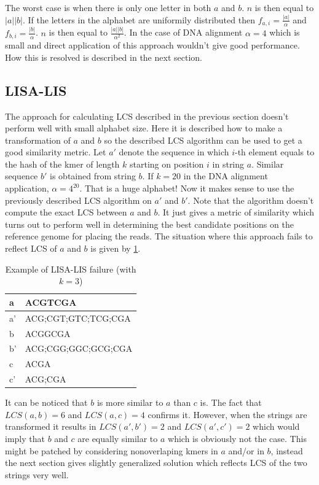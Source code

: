\documentclass[times, utf8, diplomski]{fer}
\begin{document}
The worst case is when there is only one letter in both $a$ and $b$. $n$ is then equal to $|a||b|$.
If the letters in the alphabet are uniformily distributed then $f_{a,i}=\frac{|a|}{\alpha}$ and $f_{b,i}=\frac{|b|}{\alpha}$. $n$ is then equal to $\frac{|a||b|}{\alpha^2}$.
In the case of DNA alignment $\alpha=4$ which is small and direct application of this approach wouldn't give good performance. How this is resolved is described in the next section.

\subsection{LISA-LIS}

The approach for calculating LCS described in the previous section doesn't perform well with small alphabet size. Here it is described how to make a transformation of $a$ and $b$ so the described LCS algorithm can be used to get a good similarity metric. Let $a'$ denote the sequence in which $i$-th element equals to the hash of the kmer of length $k$ starting on position $i$ in string $a$. Similar sequence $b'$ is obtained from string $b$. If $k=20$ in the DNA alignment application, $\alpha=4^{20}$. That is a huge alphabet! Now it makes sense to use the previously described LCS algorithm on $a'$ and $b'$. Note that the algorithm doesn't compute the exact LCS between $a$ and $b$. It just gives a metric of similarity which turns out to perform well in determining the best candidate positions on the reference genome for placing the reads. The situation where this approach fails to reflect LCS of $a$ and $b$ is given by \ref{lisalis.fail}.

\begin{table}[H]
\centering
\begin{tabular}{|l|l|}
\hline
	a & ACGTCGA\\
\hline
	a' & ACG;CGT;GTC;TCG;CGA\\
\hline
	b & ACGGCGA\\
\hline
	b' & ACG;CGG;GGC;GCG;CGA\\
\hline
	c & ACGA\\
\hline
	c' & ACG;CGA\\
\hline
\end{tabular}
\caption{Example of LISA-LIS failure (with $k=3$)}\label{lisalis.fail}
\end{table}

It can be noticed that $b$ is more similar to $a$ than $c$ is. The fact that $LCS(a,b)=6$ and $LCS(a,c)=4$ confirms it. However, when the strings are transformed it results in $LCS(a',b')=2$ and $LCS(a',c')=2$ which would imply that $b$ and $c$ are equally similar to $a$ which is obviously not the case. This might be patched by considering nonoverlaping kmers in $a$ and/or in $b$, instead the next section gives slightly generalized solution which reflects LCS of the two strings very well.
\end{document}
